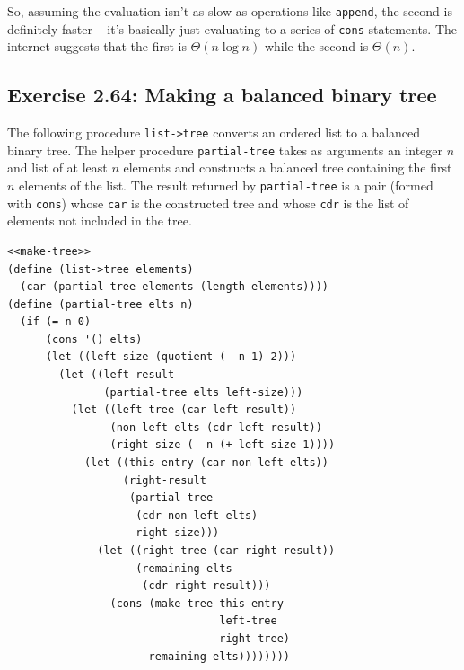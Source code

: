 \documentclass[final,fleqn,titlepage,twoside]{article}
\begin{document}
So, assuming the evaluation isn't as slow as operations like \texttt{append},
the second is definitely faster -- it's basically just evaluating to a series of
\texttt{cons} statements. The internet suggests that the first is
\(\Theta(n\log{n})\) while the second is \(\Theta(n)\).

\subsection{Exercise 2.64: Making a balanced binary tree}
\label{sec:org909c43b}
The following procedure \texttt{list->tree} converts an ordered list to a
balanced binary tree. The helper procedure \texttt{partial-tree} takes as
arguments an integer \(n\) and list of at least \(n\) elements and constructs a
balanced tree containing the first \(n\) elements of the list. The result
returned by \texttt{partial-tree} is a pair (formed with \texttt{cons})
whose \texttt{car} is the constructed tree and whose \texttt{cdr} is the
list of elements not included in the tree.

\begin{verbatim}
<<make-tree>>
(define (list->tree elements)
  (car (partial-tree elements (length elements))))
(define (partial-tree elts n)
  (if (= n 0)
      (cons '() elts)
      (let ((left-size (quotient (- n 1) 2)))
        (let ((left-result
               (partial-tree elts left-size)))
          (let ((left-tree (car left-result))
                (non-left-elts (cdr left-result))
                (right-size (- n (+ left-size 1))))
            (let ((this-entry (car non-left-elts))
                  (right-result
                   (partial-tree
                    (cdr non-left-elts)
                    right-size)))
              (let ((right-tree (car right-result))
                    (remaining-elts
                     (cdr right-result)))
                (cons (make-tree this-entry
                                 left-tree
                                 right-tree)
                      remaining-elts))))))))
\end{verbatim}
\end{document}
